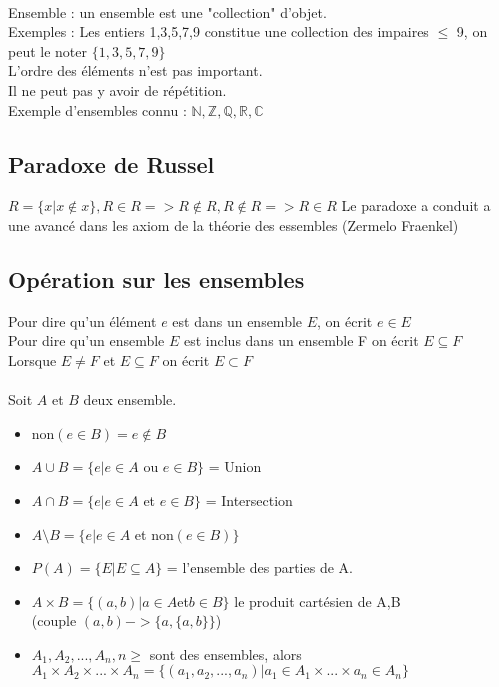 \paragraph{}
Ensemble : un ensemble est une "collection" d'objet.\\
Exemples : Les entiers 1,3,5,7,9 constitue une collection des impaires $\leq$ 9, on peut le noter $\{1,3,5,7,9\}$\\
L'ordre des éléments n'est pas important.\\
Il ne peut pas y avoir de répétition.\\
Exemple d'ensembles connu : $\mathbb{N}, \mathbb{Z}, \mathbb{Q}, \mathbb{R}, \mathbb{C}$ 

\subsection{Paradoxe de Russel}
\begin{math}
	R = \{x | x \notin x\},
	R \in R => R \notin R,
	R \notin R => R \in R
\end{math}
Le paradoxe a conduit a une avancé dans les axiom de la théorie des essembles (Zermelo Fraenkel)

\paragraph{}
\subsection{Opération sur les ensembles}
Pour dire qu'un élément $e$ est dans un ensemble $E$, on écrit $e \in E$\\
Pour dire qu'un ensemble $E$ est inclus dans un ensemble F on écrit $E \subseteq F$\\
Lorsque $E \neq F$ et $E \subseteq F$ on écrit $E \subset F$\\
\paragraph{}
Soit $A$ et $B$ deux ensemble.
\begin{itemize}
	\item non$(e \in B) = e \notin B$
	\item $A \cup B = \{e | e \in A$ ou $e \in B\}$ = Union
	\item $A \cap B = \{e | e \in A$ et $e \in B\}$ = Intersection
	\item $A \setminus B = \{e | e \in A$ et non$(e \in B)\}$
	\item $P(A) = \{E | E \subseteq A\}$ = l'ensemble des parties de A.
	\item $A \times B = \{(a,b) | a \in A $et$b \in B\}$ le produit cartésien de A,B
	\\(couple $(a,b) -> \{a,\{a,b\}\}$)
	\item $A_1, A_2, ..., A_n , n\geq$ sont des ensembles, alors\\
	$A_1 \times A_2 \times ... \times A_n = \{(a_1, a_2, ..., a_n) | a_1 \in A_1 \times ... \times a_n \in A_n\}$
\end{itemize}

